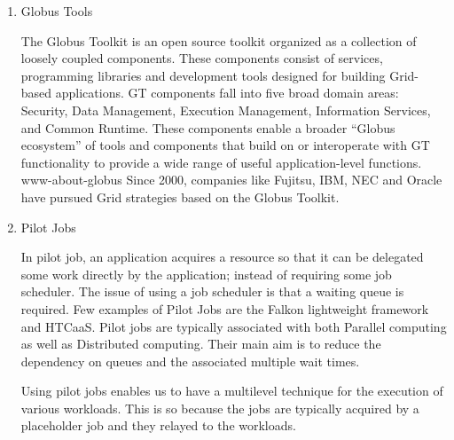 \begin{enumerate}
\item {} 
Globus Tools

\label{\detokenize{i524/technologies:id526}}{\hyperref[\detokenize{i524/technologies:sotomayor2006globus}]{\sphinxcrossref{{[}452{]}}}} The Globus Toolkit is an open source
toolkit organized as a collection of loosely coupled
components. These components consist of services, programming
libraries and development tools designed for building Grid-based
applications. GT components fall into five broad domain areas:
Security, Data Management, Execution Management, Information
Services, and Common Runtime. \label{\detokenize{i524/technologies:id527}}{\hyperref[\detokenize{i524/technologies:foster2006globus}]{\sphinxcrossref{{[}453{]}}}} These
components enable a broader ``Globus ecosystem'' of tools and
components that build on or interoperate with GT functionality to
provide a wide range of useful application-level
functions. www-about-globus \label{\detokenize{i524/technologies:id528}}{\hyperref[\detokenize{i524/technologies:www-about-globus}]{\sphinxcrossref{{[}454{]}}}} Since 2000,
companies like Fujitsu, IBM, NEC and Oracle have pursued Grid
strategies based on the Globus Toolkit.

\item {} 
Pilot Jobs

In pilot job, an application acquires a resource so that it can
be delegated some work directly by the application; instead of
requiring some job scheduler. The issue of using a job scheduler
is that a waiting queue is required. Few examples of Pilot Jobs
are the \label{\detokenize{i524/technologies:id529}}{\hyperref[\detokenize{i524/technologies:pilot-job-falkon-paper-2007}]{\sphinxcrossref{{[}455{]}}}} Falkon lightweight
framework and \label{\detokenize{i524/technologies:id530}}{\hyperref[\detokenize{i524/technologies:pilot-job-htcaas-paper-2007}]{\sphinxcrossref{{[}456{]}}}} HTCaaS. Pilot
jobs are typically associated with both Parallel computing as
well as Distributed computing. Their main aim is to reduce the
dependency on queues and the associated multiple wait times.

\label{\detokenize{i524/technologies:id531}}{\hyperref[\detokenize{i524/technologies:www-pilot-job-paper-2016}]{\sphinxcrossref{{[}457{]}}}} Using pilot jobs enables us to have a
multilevel technique for the execution of various workloads. This is so
because the jobs are typically acquired by a placeholder job and they
relayed to the workloads.

\end{enumerate}


